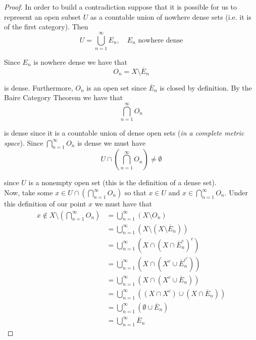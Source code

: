 \documentclass[12pt]{article}
\newlength\tindent
\renewcommand{\indent}{\hspace*{\tindent}}
\begin{document}
\begin{proof} In order to build a contradiction suppose that it is possible for us to represent an open subset $U$ as a countable union of nowhere dense sets (i.e. it is of the first category). Then
\begin{equation*}
	U = \bigcup^\infty_{n = 1} E_n, \quad E_n \text{ nowhere dense}
\end{equation*}

Since $E_n$ is nowhere dense we have that
\begin{equation*}
	O_n = X\setminus \overline{E}_n
\end{equation*}

is dense. Furthermore, $O_n$ is an open set since $\overline{E}_n$ is closed by definition. By the Baire Category Theorem we have that
\begin{equation*}
	\bigcap^\infty_{n = 1} O_n
\end{equation*}

is dense since it is a countable union of dense open sets ({\em in a complete metric space}). Since $\bigcap^\infty_{n = 1} O_n$ is dense we must have
\begin{equation*}
	U \cap \left( \bigcap^\infty_{n = 1} O_n \right) \neq \emptyset
\end{equation*}

since $U$ is a nonempty open set (this is the definition of a dense set). \\

\indent Now, take some $x \in U \cap \left( \bigcap^\infty_{n = 1} O_n \right)$ so that $x \in U$ and $x \in \bigcap^\infty_{n = 1} O_n$. Under this definition of our point $x$ we must have that
\begin{align*}
	x \notin X \setminus \left( \bigcap^\infty_{n = 1} O_n \right) &= \bigcup^\infty_{n = 1} \left( X \setminus O_n \right) \\ 
	&= \bigcup^\infty_{n = 1} \left( X \setminus \left( X \setminus \overline{E}_n \right) \right) \\
	&= \bigcup^\infty_{n = 1} \left( X \cap \left( X \cap \overline{E}^c_n \right)^c \right) \\
	&= \bigcup^\infty_{n = 1} \left( X \cap \left( X^c \cup \overline{E}^{c^c}_n \right) \right) \\
	&= \bigcup^\infty_{n = 1} \left( X \cap \left( X^c \cup \overline{E}_n \right) \right) \\
	&= \bigcup^\infty_{n = 1} \left(\left( X \cap X^c \right) \cup \left( X \cap \overline{E}_n \right) \right) \\
	&= \bigcup^\infty_{n = 1} \left(\emptyset \cup \overline{E}_n \right) \\
	&= \bigcup^\infty_{n = 1} \overline{E}_n 
\end{align*} 


\end{proof}
\end{document}
